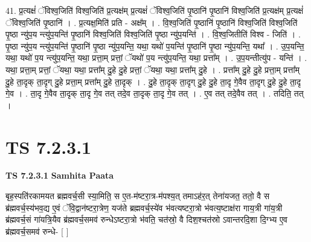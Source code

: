 \documentclass[17pt]{extarticle}
\begin{document}
41. प्र॒त्यक्षं॑ ॅविश्व॒जिति॑ विश्व॒जिति॑ प्र॒त्यक्ष॑म् प्र॒त्यक्षं॑ ॅविश्व॒जिति॑ पृ॒ष्ठानि॑ पृ॒ष्ठानि॑ विश्व॒जिति॑ प्र॒त्यक्ष॑म् प्र॒त्यक्षं॑ ॅविश्व॒जिति॑ पृ॒ष्ठानि॑ । . प्र॒त्यक्ष॒मिति॑ प्रति - अक्ष᳚म् । . वि॒श्व॒जिति॑ पृ॒ष्ठानि॑ पृ॒ष्ठानि॑ विश्व॒जिति॑ विश्व॒जिति॑ पृ॒ष्ठा न्यु॑प॒य न्त्यु॑प॒यन्ति॑ पृ॒ष्ठानि॑ विश्व॒जिति॑ विश्व॒जिति॑ पृ॒ष्ठा न्यु॑प॒यन्ति॑ । . वि॒श्व॒जितीति॑ विश्व - जिति॑ । . पृ॒ष्ठा न्यु॑प॒य न्त्यु॑प॒यन्ति॑ पृ॒ष्ठानि॑ पृ॒ष्ठा न्यु॑प॒यन्ति॒ यथा॒ यथो॑ प॒यन्ति॑ पृ॒ष्ठानि॑ पृ॒ष्ठा न्यु॑प॒यन्ति॒ यथा᳚ । . उ॒प॒यन्ति॒ यथा॒ यथो॑ प॒य न्त्यु॑प॒यन्ति॒ यथा॒ प्रत्ता॒म् प्रत्तां॒ ॅयथो॑ प॒य न्त्यु॑प॒यन्ति॒ यथा॒ प्रत्ता᳚म् । . उ॒प॒यन्तीत्यु॑प - यन्ति॑ । . यथा॒ प्रत्ता॒म् प्रत्तां॒ ॅयथा॒ यथा॒ प्रत्ता᳚म् दु॒हे दु॒हे प्रत्तां॒ ॅयथा॒ यथा॒ प्रत्ता᳚म् दु॒हे । . प्रत्ता᳚म् दु॒हे दु॒हे प्रत्ता॒म् प्रत्ता᳚म् दु॒हे ता॒दृक् ता॒दृग् दु॒हे प्रत्ता॒म् प्रत्ता᳚म् दु॒हे ता॒दृक् । . दु॒हे ता॒दृक् ता॒दृग् दु॒हे दु॒हे ता॒दृ गे॒वैव ता॒दृग् दु॒हे दु॒हे ता॒दृ गे॒व । . ता॒दृ गे॒वैव ता॒दृक् ता॒दृ गे॒व तत् तदे॒व ता॒दृक् ता॒दृ गे॒व तत् । . ए॒व तत् तदे॒वैव तत् । . तदिति॒ तत् । \newline
\pagebreak
{}

\section{ TS 7.2.3.1 }

\textbf{TS 7.2.3.1 } \newline
\textbf{Samhita Paata} \newline

बृह॒स्पति॑रकामयत ब्रह्मवर्च॒सी स्या॒मिति॒ स ए॒त-म॑ष्टरा॒त्र-म॑पश्य॒त् तमाऽह॑र॒त् तेना॑यजत॒ ततो॒ वै स ब्र॑ह्मवर्च॒स्य॑भव॒द्य ए॒वं ॅवि॒द्वान॑ष्टरा॒त्रेण॒ यज॑ते ब्रह्मवर्च॒स्ये॑व भ॑वत्यष्टरा॒त्रो भ॑वत्य॒ष्टाक्ष॑रा गाय॒त्री गा॑य॒त्री ब्र॑ह्मवर्च॒सं गा॑यत्रि॒यैव ब्र॑ह्मवर्च॒समव॑ रुन्धेऽष्टरा॒त्रो भ॑वति॒ चत॑स्रो॒ वै दिश॒श्चत॑स्रो ऽवान्तरदि॒शा दि॒ग्भ्य ए॒व ब्र॑ह्मवर्च॒समव॑ रुन्धे- [  ] \newline
\end{document}
